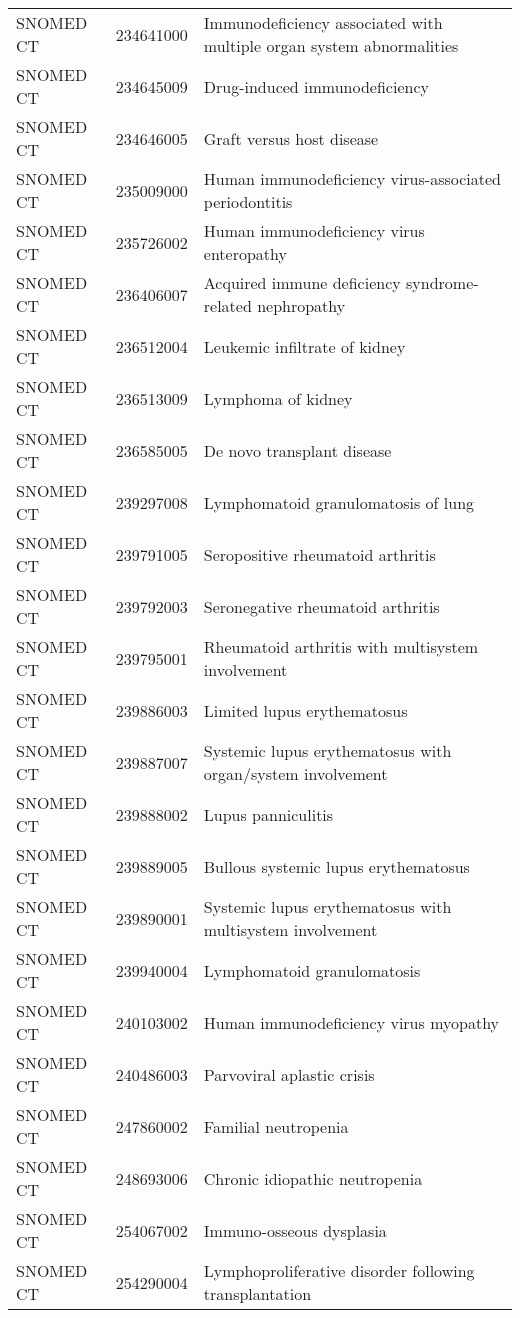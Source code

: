\begin{table}[ht]
\begin{tabular}{lll}
  SNOMED CT & 234641000 & Immunodeficiency associated with multiple organ system abnormalities \\ 
  SNOMED CT & 234645009 & Drug-induced immunodeficiency \\ 
  SNOMED CT & 234646005 & Graft versus host disease \\ 
  SNOMED CT & 235009000 & Human immunodeficiency virus-associated periodontitis \\ 
  SNOMED CT & 235726002 & Human immunodeficiency virus enteropathy \\ 
  SNOMED CT & 236406007 & Acquired immune deficiency syndrome-related nephropathy \\ 
  SNOMED CT & 236512004 & Leukemic infiltrate of kidney \\ 
  SNOMED CT & 236513009 & Lymphoma of kidney \\ 
  SNOMED CT & 236585005 & De novo transplant disease \\ 
  SNOMED CT & 239297008 & Lymphomatoid granulomatosis of lung \\ 
  SNOMED CT & 239791005 & Seropositive rheumatoid arthritis \\ 
  SNOMED CT & 239792003 & Seronegative rheumatoid arthritis \\ 
  SNOMED CT & 239795001 & Rheumatoid arthritis with multisystem involvement \\ 
  SNOMED CT & 239886003 & Limited lupus erythematosus \\ 
  SNOMED CT & 239887007 & Systemic lupus erythematosus with organ/system involvement \\ 
  SNOMED CT & 239888002 & Lupus panniculitis \\ 
  SNOMED CT & 239889005 & Bullous systemic lupus erythematosus \\ 
  SNOMED CT & 239890001 & Systemic lupus erythematosus with multisystem involvement \\ 
  SNOMED CT & 239940004 & Lymphomatoid granulomatosis \\ 
  SNOMED CT & 240103002 & Human immunodeficiency virus myopathy \\ 
  SNOMED CT & 240486003 & Parvoviral aplastic crisis \\ 
  SNOMED CT & 247860002 & Familial neutropenia \\ 
  SNOMED CT & 248693006 & Chronic idiopathic neutropenia \\ 
  SNOMED CT & 254067002 & Immuno-osseous dysplasia \\ 
  SNOMED CT & 254290004 & Lymphoproliferative disorder following transplantation \\ 

\end{tabular}
\end{table}
